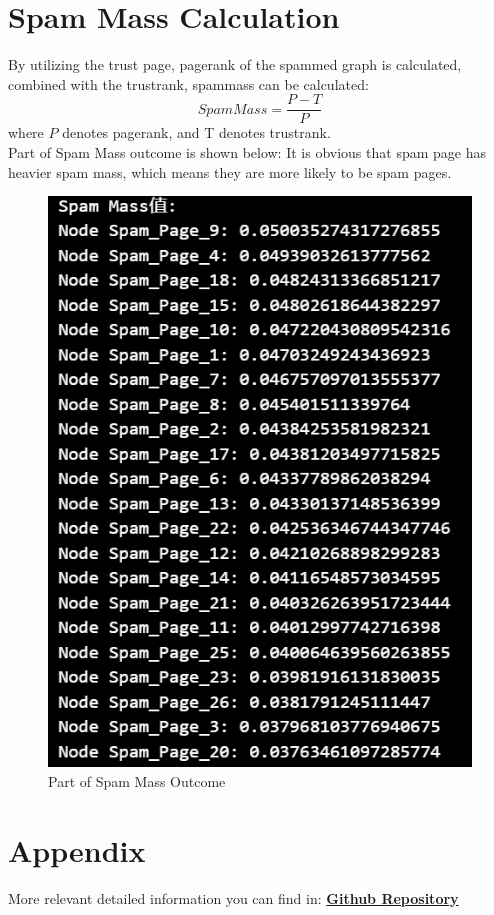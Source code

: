 \documentclass{article}
\begin{document}
	\section*{Spam Mass Calculation}
	By utilizing the trust page, pagerank of the spammed graph is calculated, combined with the trustrank, spammass can be calculated:
	$$Spam Mass = \frac{P-T}{P}$$
	where $P$ denotes pagerank, and T denotes trustrank.\\
	Part of Spam Mass outcome is shown below: It is obvious that spam page has heavier spam mass, which means they are more likely to be spam pages.
	\begin{figure}[H]
		\centering
		\includegraphics[scale=0.5]{spammass.png}
		\caption{Part of Spam Mass Outcome}
	\end{figure}
	
	\section*{Appendix}
	
	More relevant detailed information you can find in: 
	\href{https://github.com/DingYX0731/Selected-Topics-in-Frontiers-of-Statistics}{\textbf{Github Repository}}
	
	
\end{document}
